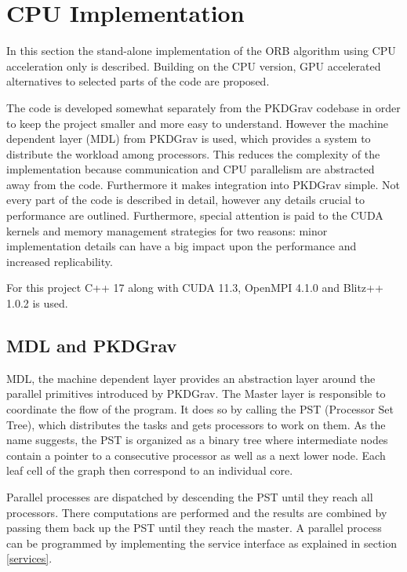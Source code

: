 \documentclass[]{article}
\begin{document}
\newpage
\section{CPU Implementation}

In this section the stand-alone implementation of the ORB algorithm using CPU acceleration only is described. Building on the CPU version, GPU accelerated alternatives to selected parts of the code are proposed. 

The code is developed somewhat separately from the PKDGrav codebase in order to keep the project smaller and more easy to understand. However the machine dependent layer (MDL) from PKDGrav is used, which provides a system to distribute the workload among processors. This reduces the complexity of the implementation because communication and CPU parallelism are abstracted away from the code. Furthermore it makes integration into PKDGrav simple.
Not every part of the code is described in detail, however any details crucial to performance are outlined. Furthermore, special attention is paid to the CUDA kernels and memory management strategies for two reasons: minor implementation details can have a big impact upon the performance and increased replicability.

For this project C++ 17 along with CUDA 11.3, OpenMPI 4.1.0 and Blitz++ 1.0.2  \cite{blitzcpp} is used. 

\subsection{MDL and PKDGrav}

MDL, the machine dependent layer provides an abstraction layer around the parallel primitives introduced by PKDGrav. The Master layer is responsible to coordinate the flow of the program. It does so by calling the PST (Processor Set Tree), which distributes the tasks and gets processors to work on them. As the name suggests, the PST is organized as a binary tree where intermediate nodes contain a pointer to a consecutive processor as well as a next lower node. Each leaf cell of the graph then correspond to an individual core.

Parallel processes are dispatched by descending the PST until they reach all processors. There computations are performed and the results are combined by passing them back up the PST until they reach the master.
A parallel process can be programmed by implementing the service interface as explained in section \ref{services}.
\end{document}
